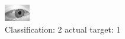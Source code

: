\begin{figure}[h!]
\begin{center}
\includegraphics[width=0.60\columnwidth]{figures/ID2729_class_2_target_1.png}
\end{center}
\caption{ Classification: 2 actual target: 1}
\label{fig:ID2729_class_2_target_1}
\end{figure}
